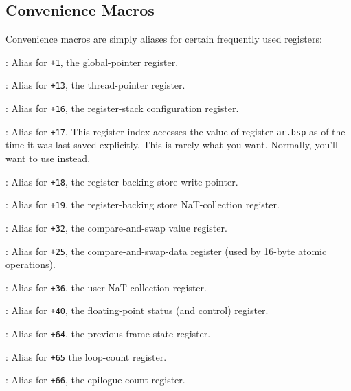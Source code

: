 \documentclass{article}
\begin{document}
\subsection{Convenience Macros}

Convenience macros are simply aliases for certain frequently used
registers:
\begin{Description}
\item[\Const{UNW\_IA64\_GP}:] Alias for \texttt{+1},
  the global-pointer register.
\item[\Const{UNW\_IA64\_TP}:] Alias for \texttt{+13},
  the thread-pointer register.
\item[\Const{UNW\_IA64\_AR\_RSC}:] Alias for \texttt{+16},
  the register-stack configuration register.
\item[\Const{UNW\_IA64\_AR\_BSP}:] Alias for
  \texttt{+17}.  This register index accesses the
  value of register \texttt{ar.bsp} as of the time it was last saved
  explicitly.  This is rarely what you want.  Normally, you'll want to
  use  instead.
\item[\Const{UNW\_IA64\_AR\_BSPSTORE}:] Alias for \texttt{+18},
  the register-backing store write pointer.
\item[\Const{UNW\_IA64\_AR\_RNAT}:] Alias for \texttt{+19},
  the register-backing store NaT-collection register.
\item[\Const{UNW\_IA64\_AR\_CCV}:] Alias for \texttt{+32},
  the compare-and-swap value register.
\item[\Const{UNW\_IA64\_AR\_CSD}:] Alias for \texttt{+25},
  the compare-and-swap-data register (used by 16-byte atomic operations).
\item[\Const{UNW\_IA64\_AR\_UNAT}:] Alias for \texttt{+36},
  the user NaT-collection register.
\item[\Const{UNW\_IA64\_AR\_FPSR}:] Alias for \texttt{+40},
  the floating-point status (and control) register.
\item[\Const{UNW\_IA64\_AR\_PFS}:] Alias for \texttt{+64},
  the previous frame-state register.
\item[\Const{UNW\_IA64\_AR\_LC}:] Alias for \texttt{+65}
  the loop-count register.
\item[\Const{UNW\_IA64\_AR\_EC}:] Alias for \texttt{+66},
  the epilogue-count register.
\end{Description}
\end{document}
